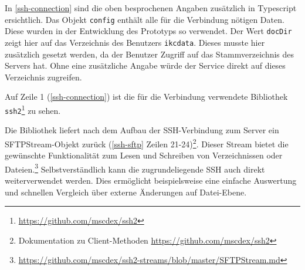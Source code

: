 In \autoref{ssh-connection} sind die oben besprochenen Angaben zu\-sätz\-lich in \gls{Typescript} ersichtlich. Das Objekt \texttt{config} enthält alle für die Verbindung nötigen Daten. Diese wurden in der Entwicklung des Prototyps so verwendet. Der Wert \texttt{docDir} zeigt hier auf das Verzeichnis des Benutzers \texttt{ikcdata}. Dieses musste hier zusätzlich gesetzt werden, da der Benutzer Zugriff auf das Stammverzeichnis des Servers hat. Ohne eine zusätzliche Angabe würde der Service direkt auf dieses Verzeichnis zugreifen.



Auf Zeile 1 (\autoref{ssh-connection}) ist die für die Verbindung verwendete Bibliothek \texttt{ssh2}\footnote{\url{https://github.com/mscdex/ssh2}} zu sehen.





Die Bibliothek liefert nach dem Aufbau der \gls{SSH}-Verbindung zum Server ein \gls{SFTP}\gls{Stream}-Objekt zurück (\autoref{ssh-sftp} Zeilen 21-24)\footnote{Dokumentation zu Client-Methoden \url{https://github.com/mscdex/ssh2}}. Dieser \gls{Stream} bietet die gewünschte Funktionalität zum Lesen und Schreiben von Verzeichnissen oder Dateien.\footnote{\url{https://github.com/mscdex/ssh2-streams/blob/master/SFTPStream.md}} Selbstverständlich kann die zugrundeliegende \gls{SSH} auch direkt weiterverwendet werden. Dies ermöglicht beispielsweise eine einfache Auswertung und schnellen Vergleich über externe Änderungen auf Datei-Ebene.




